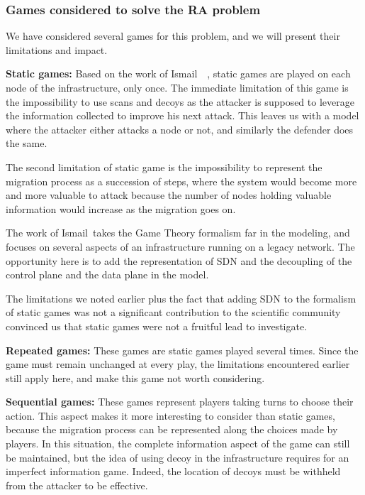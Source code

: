 \subsubsection{Games considered to solve the RA problem}
We have considered several games for this problem, and we will present their limitations and impact.

\textbf{Static games:} Based on the work of Ismail~\etal~\cite{Chen2009,interdep-ismail2017}, static games are played on each node of the infrastructure, only once. The immediate limitation of this game is the impossibility to use scans and decoys as the attacker is supposed to leverage the information collected to improve his next attack. This leaves us with a model where the attacker either attacks a node or not, and similarly the defender does the same.

The second limitation of static game is the impossibility to represent the migration process as a succession of steps, where the system would become more and more valuable to attack because the number of nodes holding valuable information would increase as the migration goes on.

The work of Ismail~\etal takes the Game Theory formalism far in the modeling, and focuses on several aspects of an infrastructure running on a legacy network. The opportunity here is to add the representation of SDN and the decoupling of the control plane and the data plane in the model.

The limitations we noted earlier plus the fact that adding SDN to the formalism of static games was not a significant contribution to the scientific community convinced us that static games were not a fruitful lead to investigate.

\textbf{Repeated games: } These games are static games played several times.
Since the game must remain unchanged at every play, the limitations encountered earlier still apply here, and make this game not worth considering.

\textbf{Sequential games: } These games represent players taking turns to choose their action. This aspect makes it more interesting to consider than static games, because the migration process can be represented along the choices made by players. In this situation, the complete information aspect of the game can still be maintained, but the idea of using decoy in the infrastructure requires for an imperfect information game. Indeed, the location of decoys must be withheld from the attacker to be effective.

